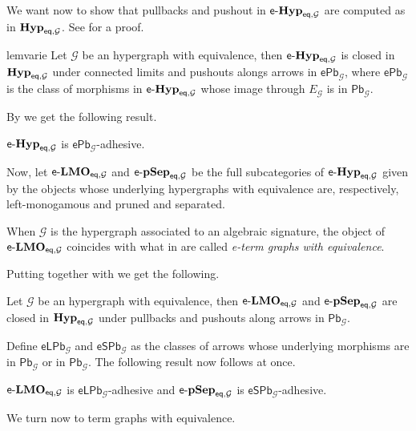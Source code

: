 \documentclass[3p]{elsarticle}
\newcommand{\pbc}{\mathsf{Pb}}
\newcommand{\pbe}{\mathsf{ePb}}
\newcommand{\epbl}{\mathsf{eLPb}}
\newcommand{\epbs}{\mathsf{eSPb}}
\newcommand{\eq}{\mathsf{eq}}
\newcommand{\eg}[0]{\mathbf{EGG}}
\newcommand{\catname}[1]{\textbf{\textup{#1}}}
\newcommand{\hyp}{\catname{Hyp}}
\newcommand{\EqTG}{\catname{EqTG}}
\newcommand{\eggl}{\mathsf{e}\text{-}\catname{Hyp}_{\eq, \mathcal{G}}}
\newcommand{\lelm}{\mathsf{e}\text{-}\catname{LMO}_{\eq, \mathcal{G}}}
\newcommand{\leps}{\mathsf{e}\text{-}\catname{pSep}_{\eq, \mathcal{G}}}
\theoremstyle{remark}
\theoremstyle{definition}
\begin{document}
We want now to show that pullbacks and pushout in $\eggl$ are computed as in $\hyp_{\eq, \mathcal{G}}$. See  for a proof.


\begin{restatable}{lem}{varie}\label{prop:varie}
	Let $\mathcal{G}$ be an hypergraph with equivalence, then $\eggl$ is closed in $\hyp_{\eq, \mathcal{G}}$ under connected limits and pushouts alongs arrows in $\pbe_\mathcal{G}$, where $\pbe_\mathcal{G}$ is the class of morphisms in $\eggl$ whose image through $E_\mathcal{G}$ is in $\pbc_\mathcal{G}$. 
\end{restatable}

%
By  we get the following result.

\begin{cor}\label{cor:eggade1}
	$\eggl$ is $\pbe_\mathcal{G}$-adhesive.
\end{cor}

Now, let $\lelm$ and $\leps$ be the full subcategories of $\eggl$ given by the objects whose underlying hypergraphs with equivalence are, respectively, left-monogamous and pruned and separated. 


\begin{rem}
When $\mathcal{G}$ is the hypergraph associated to an algebraic signature, the object of  $\lelm$ coincides with what in \cite{uovadesive} are called \emph{e-term graphs with equivalence}. 
\end{rem}

Putting together  with  we get the following.

\begin{lem}Let $\mathcal{G}$ be an hypergraph with equivalence, then $\lelm$ and $\leps$ are closed in $\hyp_{\eq, \mathcal{G}}$ under pullbacks and pushouts along arrows in $\pbc_{\mathcal{G}}$.
\end{lem}

Define $\epbl_{\mathcal{G}}$ and $\epbs_{\mathcal{G}}$ as the classes of arrows whose underlying morphisms are in $\pbc_{\mathcal{G}}$ or in $\pbc_{\mathcal{G}}$. The following result now follows at once.

\begin{cor}
	$\lelm$ is $\epbl_{\mathcal{G}}$-adhesive and $\leps$ is $\epbs_{\mathcal{G}}$-adhesive.
\end{cor}


\iffalse 
We turn now to term graphs with equivalence.

\end{document}
